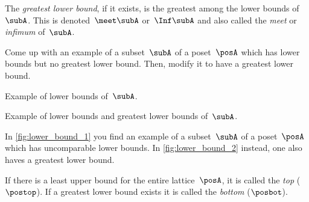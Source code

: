 \begin{ctdefinition}
    The \emph{greatest lower bound}, if it exists, is the greatest among the lower bounds of~$\subA$.
    This is denoted~$\meet \subA$ or~$\Inf \subA$ and also called the \emph{meet} or \emph{infimum} of~$\subA$.
\end{ctdefinition}

\begin{exercise}
    Come up with an example of a subset~$\subA$ of a poset~$\posA$ which has lower bounds but no greatest lower bound.
    Then, modify it to have a greatest lower bound.
\end{exercise}

\begin{solution}
    \begin{marginfigure}
        \centering
        \caption{Example of lower bounds of~$\subA$. \label{fig:lower_bound_1}}
    \end{marginfigure}
    \begin{marginfigure}
        \centering
        \caption{Example of lower bounds and greatest lower bounds of~$\subA$. \label{fig:lower_bound_2}}
    \end{marginfigure}

    In \cref{fig:lower_bound_1} you find an example of a subset~$\subA$ of a poset~$\posA$ which has uncomparable lower bounds.
    In \cref{fig:lower_bound_2} instead, one also haves a greatest lower bound.
\end{solution}

\begin{definition}
    \label{def:top}
    \label{def:bot}
    If there is a least upper bound for the entire lattice~$\posA$, it is called the \emph{top} ($\postop$).
    If a greatest lower bound exists it is called the \emph{bottom} ($\posbot$).
\end{definition}
